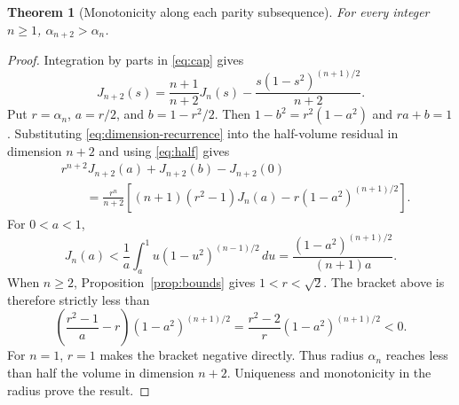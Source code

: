 \documentclass[11pt,a4paper]{article}
\numberwithin{equation}{section}
\newtheorem{theorem}{Theorem}[section]
\theoremstyle{definition}
\theoremstyle{remark}
\begin{document}
\begin{theorem}[Monotonicity along each parity subsequence]\label{thm:monotone}
For every integer $n\geq1$, $\alpha_{n+2}>\alpha_n$.
\end{theorem}
\begin{proof}
Integration by parts in \eqref{eq:cap} gives
\begin{equation}\label{eq:dimension-recurrence}
 J_{n+2}(s)=\frac{n+1}{n+2}J_n(s)
 -\frac{s(1-s^2)^{(n+1)/2}}{n+2}.
\end{equation}
Put $r=\alpha_n$, $a=r/2$, and $b=1-r^2/2$. Then $1-b^2=r^2(1-a^2)$ and $ra+b=1$. Substituting \eqref{eq:dimension-recurrence} into the half-volume residual in dimension $n+2$ and using \eqref{eq:half} gives
\begin{align*}
 &r^{n+2}J_{n+2}(a)+J_{n+2}(b)-J_{n+2}(0)\\
 &\qquad=\frac{r^n}{n+2}
 \left[(n+1)(r^2-1)J_n(a)-r(1-a^2)^{(n+1)/2}\right].
\end{align*}
For $0<a<1$,
\[
 J_n(a)<\frac1a\int_a^1u(1-u^2)^{(n-1)/2}\,du
 =\frac{(1-a^2)^{(n+1)/2}}{(n+1)a}.
\]
When $n\geq2$, Proposition~\ref{prop:bounds} gives $1<r<\sqrt2$. The bracket above is therefore strictly less than
\[
 \left(\frac{r^2-1}{a}-r\right)(1-a^2)^{(n+1)/2}
 =\frac{r^2-2}{r}(1-a^2)^{(n+1)/2}<0.
\]
For $n=1$, $r=1$ makes the bracket negative directly. Thus radius $\alpha_n$ reaches less than half the volume in dimension $n+2$. Uniqueness and monotonicity in the radius prove the result.
\end{proof}
\end{document}
